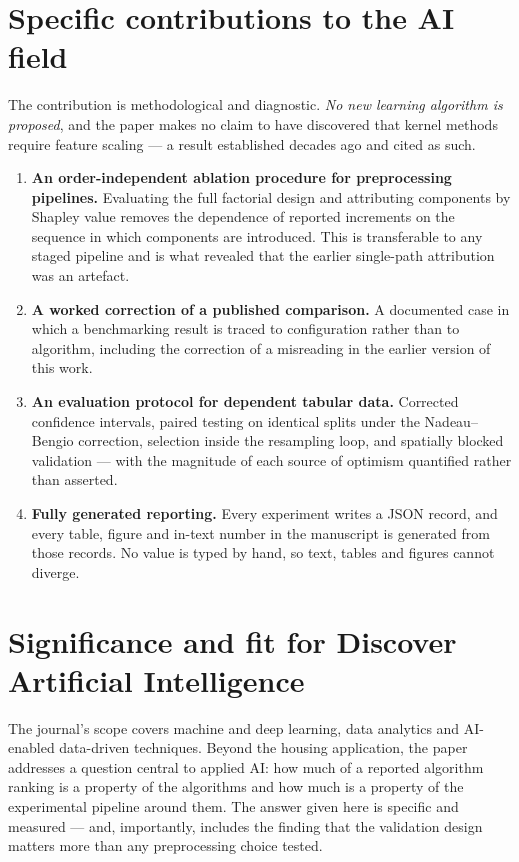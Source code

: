 \documentclass[11pt,a4paper]{article}
\begin{document}
\section{Specific contributions to the AI field}
The contribution is methodological and diagnostic. \emph{No new learning algorithm is
proposed}, and the paper makes no claim to have discovered that kernel methods require
feature scaling --- a result established decades ago and cited as such.

\begin{enumerate}[leftmargin=*,itemsep=3pt]
\item \textbf{An order-independent ablation procedure for preprocessing pipelines.}
      Evaluating the full factorial design and attributing components by Shapley value removes
      the dependence of reported increments on the sequence in which components are
      introduced. This is transferable to any staged pipeline and is what revealed that the
      earlier single-path attribution was an artefact.
\item \textbf{A worked correction of a published comparison.} A documented case in which a
      benchmarking result is traced to configuration rather than to algorithm, including the
      correction of a misreading in the earlier version of this work.
\item \textbf{An evaluation protocol for dependent tabular data.} Corrected confidence
      intervals, paired testing on identical splits under the Nadeau--Bengio correction,
      selection inside the resampling loop, and spatially blocked validation --- with the
      magnitude of each source of optimism quantified rather than asserted.
\item \textbf{Fully generated reporting.} Every experiment writes a JSON record, and every
      table, figure and in-text number in the manuscript is generated from those records. No
      value is typed by hand, so text, tables and figures cannot diverge.
\end{enumerate}

\section{Significance and fit for Discover Artificial Intelligence}
The journal's scope covers machine and deep learning, data analytics and AI-enabled
data-driven techniques. Beyond the housing application, the paper addresses a question central
to applied AI: how much of a reported algorithm ranking is a property of the algorithms and
how much is a property of the experimental pipeline around them. The answer given here is
specific and measured --- and, importantly, includes the finding that the validation design
matters more than any preprocessing choice tested.
\end{document}
